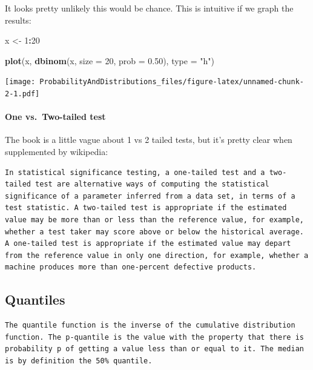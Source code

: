 \documentclass[]{article}
\newenvironment{Shaded}{\begin{snugshade}}{\end{snugshade}}
\newcommand{\KeywordTok}[1]{\textcolor[rgb]{0.13,0.29,0.53}{\textbf{#1}}}
\newcommand{\DataTypeTok}[1]{\textcolor[rgb]{0.13,0.29,0.53}{#1}}
\newcommand{\DecValTok}[1]{\textcolor[rgb]{0.00,0.00,0.81}{#1}}
\newcommand{\FloatTok}[1]{\textcolor[rgb]{0.00,0.00,0.81}{#1}}
\newcommand{\StringTok}[1]{\textcolor[rgb]{0.31,0.60,0.02}{#1}}
\newcommand{\OperatorTok}[1]{\textcolor[rgb]{0.81,0.36,0.00}{\textbf{#1}}}
\newcommand{\NormalTok}[1]{#1}
\let\oldparagraph\paragraph
\renewcommand{\paragraph}[1]{\oldparagraph{#1}\mbox{}}
\begin{document}
It looks pretty unlikely this would be chance. This is intuitive if we
graph the results:

\begin{Shaded}
\begin{Highlighting}[]
\NormalTok{x <-}\StringTok{ }\DecValTok{1}\OperatorTok{:}\DecValTok{20}

\KeywordTok{plot}\NormalTok{(x, }\KeywordTok{dbinom}\NormalTok{(x, }\DataTypeTok{size =} \DecValTok{20}\NormalTok{, }\DataTypeTok{prob =} \FloatTok{0.50}\NormalTok{), }\DataTypeTok{type =} \StringTok{"h"}\NormalTok{)}
\end{Highlighting}
\end{Shaded}

\texttt{[image: ProbabilityAndDistributions\_files/figure-latex/unnamed-chunk-2-1.pdf]}

\paragraph{One vs.~Two-tailed test}\label{one-vs.two-tailed-test}

The book is a little vague about 1 vs 2 tailed tests, but it's pretty
clear when supplemented by wikipedia:

\begin{verbatim}
In statistical significance testing, a one-tailed test and a two-tailed test are alternative ways of computing the statistical significance of a parameter inferred from a data set, in terms of a test statistic. A two-tailed test is appropriate if the estimated value may be more than or less than the reference value, for example, whether a test taker may score above or below the historical average. A one-tailed test is appropriate if the estimated value may depart from the reference value in only one direction, for example, whether a machine produces more than one-percent defective products.
\end{verbatim}

\subsection{Quantiles}\label{quantiles}

\begin{verbatim}
The quantile function is the inverse of the cumulative distribution function. The p-quantile is the value with the property that there is probability p of getting a value less than or equal to it. The median is by definition the 50% quantile.
\end{verbatim}
\end{document}
